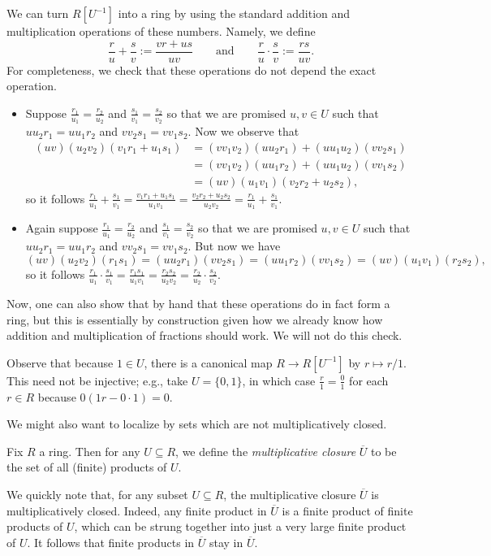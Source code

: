 We can turn $R\left[U^{-1}\right]$ into a ring by using the standard addition and multiplication operations of these numbers. Namely, we define
\[\frac{r}{u}+\frac{s}{v}:=\frac{vr+us}{uv}\qquad\text{and}\qquad\frac ru\cdot\frac sv:=\frac{rs}{uv}.\]
For completeness, we check that these operations do not depend the exact operation.
\begin{itemize}
	\item Suppose $\frac{r_1}{u_1}=\frac{r_2}{u_2}$ and $\frac{s_1}{v_1}=\frac{s_2}{v_2}$ so that we are promised $u,v\in U$ such that $uu_2r_1=uu_1r_2$ and $vv_2s_1=vv_1s_2$. Now we observe that
	\begin{align*}
		(uv)(u_2v_2)(v_1r_1+u_1s_1) &= (vv_1v_2)(uu_2r_1)+(uu_1u_2)(vv_2s_1) \\
		&= (vv_1v_2)(uu_1r_2)+(uu_1u_2)(vv_1s_2) \\
		&= (uv)(u_1v_1)(v_2r_2+u_2s_2),
	\end{align*}
	so it follows $\frac{r_1}{u_1}+\frac{s_1}{v_1}=\frac{v_1r_1+u_1s_1}{u_1v_1}=\frac{v_2r_2+u_2s_2}{u_2v_2}=\frac{r_1}{u_1}+\frac{s_1}{v_1}$.
	\item Again suppose $\frac{r_1}{u_1}=\frac{r_2}{u_2}$ and $\frac{s_1}{v_1}=\frac{s_2}{v_2}$ so that we are promised $u,v\in U$ such that $uu_2r_1=uu_1r_2$ and $vv_2s_1=vv_1s_2$. But now we have
	\[(uv)(u_2v_2)(r_1s_1) = (uu_2r_1)(vv_2s_1)=(uu_1r_2)(vv_1s_2)=(uv)(u_1v_1)(r_2s_2),\]
	so it follows $\frac{r_1}{u_1}\cdot\frac{s_1}{v_1}=\frac{r_1s_1}{u_1v_1}=\frac{r_2s_2}{u_2v_2}=\frac{r_2}{u_2}\cdot\frac{s_2}{v_2}$.
\end{itemize}
Now, one can also show that by hand that these operations do in fact form a ring, but this is essentially by construction given how we already know how addition and multiplication of fractions should work. We will not do this check.
\begin{remark}
	Observe that because $1\in U$, there is a canonical map $R\to R\left[U^{-1}\right]$ by $r\mapsto r/1$. This need not be injective; e.g., take $U=\{0,1\}$, in which case $\frac r1=\frac01$ for each $r\in R$ because $0(1r-0\cdot1)=0$.
\end{remark}

We might also want to localize by sets which are not multiplicatively closed.
\begin{definition}
	Fix $R$ a ring. Then for any $U\subseteq R$, we define the \textit{multiplicative closure} $\overline U$ to be the set of all (finite) products of $U$.
\end{definition}
We quickly note that, for any subset $U\subseteq R$, the multiplicative closure $\overline U$ is multiplicatively closed. Indeed, any finite product in $\overline U$ is a finite product of finite products of $U$, which can be strung together into just a very large finite product of $U$. It follows that finite products in $\overline U$ stay in $\overline U$.

